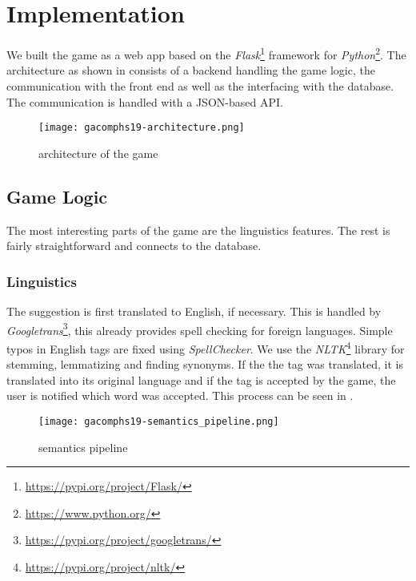 \section{Implementation}
\label{gacomphs19:sec:implementation}

We built the game as a web app based on the \textit{Flask}\footnote{\url{https://pypi.org/project/Flask/}} framework for \textit{Python}\footnote{\url{https://www.python.org/}}. The architecture as shown in  consists of a backend handling the game logic, the communication with the front end as well as the interfacing with the database. The communication is handled with a JSON-based API.

\begin{figure}[!]
	\centering
	\texttt{[image: gacomphs19-architecture.png]}
	\caption{architecture of the game}
	\label{gacomphs19:fig:architecture}
\end{figure}

\subsection{Game Logic}
\label{gacomphs19:sec:implementation:game}

The most interesting parts of the game are the linguistics features. The rest is fairly straightforward and connects to the database.

\subsubsection{Linguistics}
\label{gacomphs19:sec:implementation:linguistics}
The suggestion is first translated to English, if necessary. This is handled by \textit{Googletrans}\footnote{\url{https://pypi.org/project/googletrans/}}, this already provides spell checking for foreign languages.
Simple typos in English tags are fixed using \textit{SpellChecker}. We use the \textit{NLTK}\footnote{\url{https://pypi.org/project/nltk/}} library for stemming, lemmatizing and finding synonyms. If the the tag was translated, it is translated into its original language and if the tag is accepted by the game, the user is notified which word was accepted. This process can be seen in .

\begin{figure}[tb]
	\centering
	\texttt{[image: gacomphs19-semantics\_pipeline.png]}
	\caption{semantics pipeline}
	\label{gacomphs19:fig:semanticpipeline}
\end{figure}

